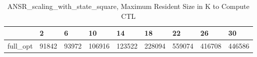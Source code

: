 \begin{table}
\caption{ANSR\_scaling\_with\_state\_square, Maximum Resident Size in K to Compute CTL}
\label{ANSR_scaling_with_state_square_CTL_size}
\begin{tabular}{lllllllll}
\toprule
 & 2 & 6 & 10 & 14 & 18 & 22 & 26 & 30 \\
\midrule
full\_opt & 91842 & 93972 & 106916 & 123522 & 228094 & 559074 & 416708 & 446586 \\
\bottomrule
\end{tabular}
\end{table}
